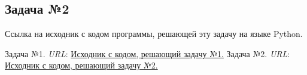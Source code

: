 \documentclass[12pt]{article}
\begin{document}
	\subsection*{Задача №2}
	
	Ссылка на исходник с кодом программы, решающей эту задачу на языке Python. \cite{TaskNumber2}
	\newpage
	
	\begin{thebibliography}{99}
		Задача №1. \textit{URL}: \href{https://colab.research.google.com/drive/1hU3V-uFTl9Eqq9hKGlbg4017R-LNO2Ed?usp=sharing}{Исходник с кодом, решающий задачу №1.}
		Задача №2. \textit{URL}: \href{https://colab.research.google.com/drive/1jZ2odN8TAdEDsBw6dNhFYbSYFFkQi2u0?usp=sharing}{Исходник с кодом, решающий задачу №2.}
	\end{thebibliography}
	
\end{document}
